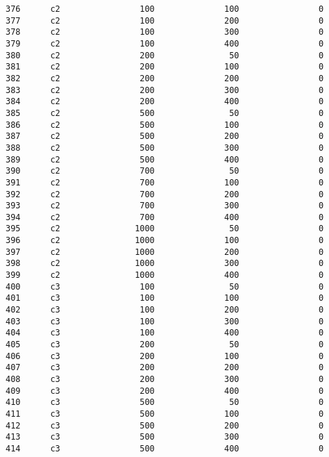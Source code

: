 \documentclass[11pt]{article}
\begin{document}
\begin{Verbatim}[commandchars=\\\{\}]
376      c2                100              100                0   
377      c2                100              200                0   
378      c2                100              300                0   
379      c2                100              400                0   
380      c2                200               50                0   
381      c2                200              100                0   
382      c2                200              200                0   
383      c2                200              300                0   
384      c2                200              400                0   
385      c2                500               50                0   
386      c2                500              100                0   
387      c2                500              200                0   
388      c2                500              300                0   
389      c2                500              400                0   
390      c2                700               50                0   
391      c2                700              100                0   
392      c2                700              200                0   
393      c2                700              300                0   
394      c2                700              400                0   
395      c2               1000               50                0   
396      c2               1000              100                0   
397      c2               1000              200                0   
398      c2               1000              300                0   
399      c2               1000              400                0   
400      c3                100               50                0   
401      c3                100              100                0   
402      c3                100              200                0   
403      c3                100              300                0   
404      c3                100              400                0   
405      c3                200               50                0   
406      c3                200              100                0   
407      c3                200              200                0   
408      c3                200              300                0   
409      c3                200              400                0   
410      c3                500               50                0   
411      c3                500              100                0   
412      c3                500              200                0   
413      c3                500              300                0   
414      c3                500              400                0   

\end{Verbatim}
\end{document}

